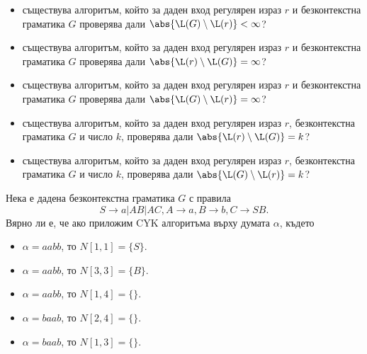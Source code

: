 \begin{itemize}
\item
  съществува алгоритъм, който за даден вход регулярен израз $r$ и безконтекстна граматика $G$
  проверява дали $\abs{\L(G) \setminus \L(r)} < \infty$?
\item
  съществува алгоритъм, който за даден вход регулярен израз $r$ и безконтекстна граматика $G$
  проверява дали $\abs{\L(r) \setminus \L(G)} = \infty$?
\item
  съществува алгоритъм, който за даден вход регулярен израз $r$ и безконтекстна граматика $G$
  проверява дали $\abs{\L(G) \setminus \L(r)} = \infty$?
\item
  съществува алгоритъм, който за даден вход регулярен израз $r$, безконтекстна граматика $G$
  и число $k$, проверява дали $\abs{\L(r) \setminus \L(G)} = k$?
\item
  съществува алгоритъм, който за даден вход регулярен израз $r$, безконтекстна граматика $G$
  и число $k$, проверява дали $\abs{\L(G) \setminus \L(r)} = k$?
\end{itemize}

Нека е дадена безконтекстна граматика $G$ с правила \[S\rightarrow a\vert AB \vert AC, A \rightarrow a, B\rightarrow b, C\rightarrow SB.\]
Вярно ли е, че ако приложим CYK алгоритъма върху думата $\alpha$, където
\begin{itemize}
\item 
  $\alpha = aabb$, то $N[1,1] = \{S\}$.
\item 
  $\alpha = aabb$, то $N[3,3] = \{B\}$.
\item 
  $\alpha = aabb$, то $N[1,4] = \{\}$.
\item
  $\alpha = baab$, то $N[2,4] = \{\}$.
\item
  $\alpha = baab$, то $N[1,3] = \{\}$.
\end{itemize}



